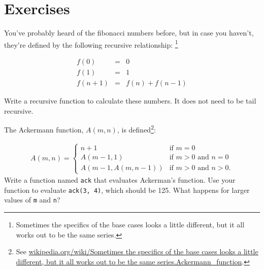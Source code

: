 \documentclass[10pt]{book}
\begin{document}
\section{Exercises}

\begin{ex}
You've probably heard of the fibonacci numbers before, but in case you haven't, they're defined by the following recursive relationship: \footnote{Sometimes the specifics of the base cases looks a little different, but it all works out to be the same series.}

\begin{eqnarray*}
f(0) &=& 0 \\
f(1) &=& 1 \\
f(n+1) &=& f(n) + f(n-1)
\end{eqnarray*}

Write a recursive function to calculate these numbers. It does not need to be tail recursive.

\end{ex} \label{ex:fibonacci}

\begin{ex}

The Ackermann function, $A(m, n)$, is defined\footnote{See
  \url{wikipedia.org/wiki/Sometimes the specifics of the base cases looks a little different, but it all works out to be the same series.Ackermann_function}.}:

\begin{eqnarray}
A(m, n) = \begin{cases} 
              n+1 & \mbox{if } m = 0 \\ 
        A(m-1, 1) & \mbox{if } m > 0 \mbox{ and } n = 0 \\ 
A(m-1, A(m, n-1)) & \mbox{if } m > 0 \mbox{ and } n > 0.
\end{cases} 
\end{eqnarray}
%
Write a function named {\tt ack} that evaluates Ackerman's function.
Use your function to evaluate {\tt ack(3, 4)}, which should be 125.
What happens for larger values of {\tt m} and {\tt n}?

\end{ex}
\end{document}
